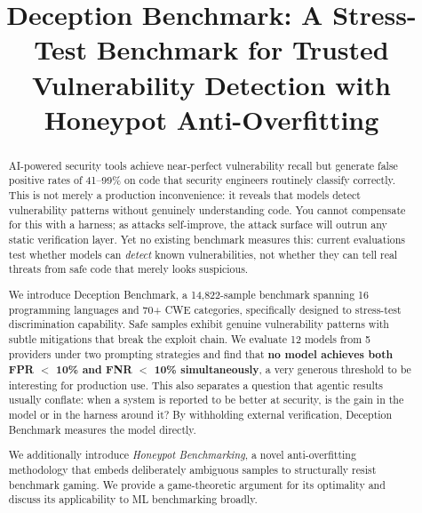 \documentclass[conference]{IEEEtran}
\begin{document}
\title{Deception Benchmark: A Stress-Test Benchmark for Trusted Vulnerability Detection with Honeypot Anti-Overfitting}

\author{
}

\maketitle

\begin{abstract}
AI-powered security tools achieve near-perfect vulnerability recall but generate false positive rates of 41--99\% on code that security engineers routinely classify correctly. This is not merely a production inconvenience: it reveals that models detect vulnerability patterns without genuinely understanding code. You cannot compensate for this with a harness; as attacks self-improve, the attack surface will outrun any static verification layer. Yet no existing benchmark measures this: current evaluations test whether models can \emph{detect} known vulnerabilities, not whether they can tell real threats from safe code that merely looks suspicious.

We introduce Deception Benchmark, a 14,822-sample benchmark spanning 16 programming languages and 70+ CWE categories, specifically designed to stress-test discrimination capability. Safe samples exhibit genuine vulnerability patterns with subtle mitigations that break the exploit chain. We evaluate 12 models from 5 providers under two prompting strategies and find that \textbf{no model achieves both FPR $<$ 10\% and FNR $<$ 10\% simultaneously}, a very generous threshold to be interesting for production use. This also separates a question that agentic results usually conflate: when a system is reported to be better at security, is the gain in the model or in the harness around it? By withholding external verification, Deception Benchmark measures the model directly.

We additionally introduce \emph{Honeypot Benchmarking}, a novel anti-overfitting methodology that embeds deliberately ambiguous samples to structurally resist benchmark gaming. We provide a game-theoretic argument for its optimality and discuss its applicability to ML benchmarking broadly.
\end{abstract}
\end{document}
